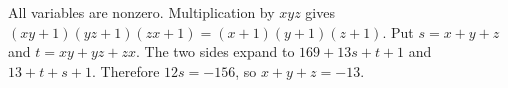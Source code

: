 All variables are nonzero. Multiplication by $xyz$ gives $(xy+1)(yz+1)(zx+1)=(x+1)(y+1)(z+1)$. Put $s=x+y+z$ and $t=xy+yz+zx$. The two sides expand to $169+13s+t+1$ and $13+t+s+1$. Therefore $12s=-156$, so $\boxed{x+y+z=-13}$.
